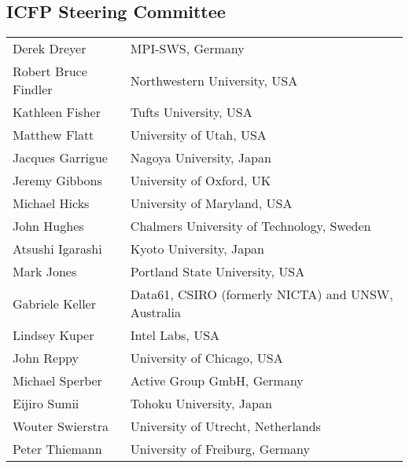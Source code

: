 \subsection*{\sffamily ICFP Steering Committee}

\begin{tabular}{@{}p{\namewidth}l@{}}
Derek Dreyer & MPI-SWS, Germany \\
Robert Bruce Findler & Northwestern University, USA \\
Kathleen Fisher & Tufts University, USA \\
Matthew Flatt & University of Utah, USA \\
Jacques Garrigue & Nagoya University, Japan \\
Jeremy Gibbons & University of Oxford, UK \\
Michael Hicks & University of Maryland, USA \\
John Hughes & Chalmers University of Technology, Sweden \\
Atsushi Igarashi & Kyoto University, Japan \\
Mark Jones & Portland State University, USA \\
Gabriele Keller & Data61, CSIRO (formerly NICTA) and UNSW, Australia \\
Lindsey Kuper & Intel Labs, USA \\
John Reppy & University of Chicago, USA \\
Michael Sperber & Active Group GmbH, Germany \\
Eijiro Sumii & Tohoku University, Japan \\
Wouter Swierstra & University of Utrecht, Netherlands \\
Peter Thiemann & University of Freiburg, Germany \\
\end{tabular}


\newpage
